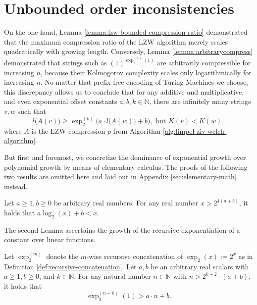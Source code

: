 \section{Unbounded order inconsistencies }
\label{sec:unbounded-order-inconsistencies}
On the one hand, Lemma \ref{lemma:lzw-bounded-compression-ratio} demonstrated that the maximum compression ratio of the LZW algorithm merely scales quadratically with growing length. 
Conversely, Lemma \ref{lemma:arbitrarycompress} demonstrated that strings such as $(1)^{\exp_2^{(n)}(1)}$ are arbitrarily compressible for increasing $n$, because their Kolmogorov complexity scales only logarithmically for increasing $n$.
No matter that prefix-free encoding of Turing Machines we choose, this discrepancy allows us to conclude that for any additive and multiplicative, and even exponential offset constants $a,b,k\in\mathbb{N}$, there are infinitely many strings $v,w$ such that 
\begin{equation}
	l\bigl(A(v)\bigr)\geq \exp_2^{(k)}\bigl(a\cdot l\bigl( A(w)\bigr) + b\bigr), \text{ but } K(v) < K(w),
\end{equation}
where $A$ is the LZW compression $p$ from Algorithm \ref{alg:limpel-ziv-welch-algorithm}.

But first and foremost, we concretize the dominance of exponential growth over polynomial growth by means of elementary calculus.
The proofs of the following two results are omitted here and laid out in Appendix \ref{sec:elementary-math} instead.
\begin{lemma}
	\label{lemma:log-lin-add-inequality-placeholder}
	Let $a\geq 1,b\geq 0$ be arbitrary real numbers.
	For any real number $x > 2^{4(a+b)}$, it holds that $a\log_2(x)+b < x$.
\end{lemma}
The second Lemma ascertains the growth of the recursive exponentiation of a constant over linear functions.
\begin{lemma}
	\label{lemma:cascade-exp-inequality-basis-placeholder}
	Let $\exp_2^{(m)}$ denote the $m$-wise recursive concatenation of $\exp_2(x):=2^x$ as in Definition \ref{def:recursive-concatenation}.
	Let $a,b$ be an arbitrary real scalars with $a\geq 1,b\geq 0$, and $k\in\mathbb{N}$. 
	For any natural number $n\in\mathbb{N}$ with $n>2^{k+2}\cdot (a+b)$, it holds that
	\begin{equation}
		\exp_2^{(n-k)}(1) > a\cdot n + b.
	\end{equation}
\end{lemma}

